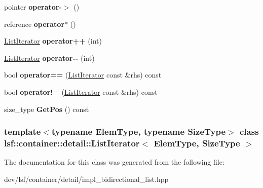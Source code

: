\begin{DoxyCompactItemize}
\item 
\hypertarget{classlsf_1_1container_1_1detail_1_1ListIterator_aae23fe9a8b582b27d49469e9b2d856a6}{
pointer {\bfseries operator-\/$>$} ()}
\label{classlsf_1_1container_1_1detail_1_1ListIterator_aae23fe9a8b582b27d49469e9b2d856a6}

\item 
\hypertarget{classlsf_1_1container_1_1detail_1_1ListIterator_a1461443a653a5e9548b0b4030ba092e7}{
reference {\bfseries operator$\ast$} ()}
\label{classlsf_1_1container_1_1detail_1_1ListIterator_a1461443a653a5e9548b0b4030ba092e7}

\item 
\hypertarget{classlsf_1_1container_1_1detail_1_1ListIterator_ad2883b3bd7d78fbac482e0cf2fb25df8}{
\hyperlink{classlsf_1_1container_1_1detail_1_1ListIterator}{ListIterator} {\bfseries operator++} (int)}
\label{classlsf_1_1container_1_1detail_1_1ListIterator_ad2883b3bd7d78fbac482e0cf2fb25df8}

\item 
\hypertarget{classlsf_1_1container_1_1detail_1_1ListIterator_aa5dd72db1d28b2d95c3da1204f3e1b46}{
\hyperlink{classlsf_1_1container_1_1detail_1_1ListIterator}{ListIterator} {\bfseries operator-\/-\/} (int)}
\label{classlsf_1_1container_1_1detail_1_1ListIterator_aa5dd72db1d28b2d95c3da1204f3e1b46}

\item 
\hypertarget{classlsf_1_1container_1_1detail_1_1ListIterator_af3b1a2bdb7a11bdcb8e29d1b548834b5}{
bool {\bfseries operator==} (\hyperlink{classlsf_1_1container_1_1detail_1_1ListIterator}{ListIterator} const \&rhs) const }
\label{classlsf_1_1container_1_1detail_1_1ListIterator_af3b1a2bdb7a11bdcb8e29d1b548834b5}

\item 
\hypertarget{classlsf_1_1container_1_1detail_1_1ListIterator_a573f8acfca6184829d4095d77d398a46}{
bool {\bfseries operator!=} (\hyperlink{classlsf_1_1container_1_1detail_1_1ListIterator}{ListIterator} const \&rhs) const }
\label{classlsf_1_1container_1_1detail_1_1ListIterator_a573f8acfca6184829d4095d77d398a46}

\item 
\hypertarget{classlsf_1_1container_1_1detail_1_1ListIterator_a495d7d4af83cd34e5830fbada7b3ac5a}{
size\_\-type {\bfseries GetPos} () const }
\label{classlsf_1_1container_1_1detail_1_1ListIterator_a495d7d4af83cd34e5830fbada7b3ac5a}

\end{DoxyCompactItemize}
\subsubsection*{template$<$typename ElemType, typename SizeType$>$ class lsf::container::detail::ListIterator$<$ ElemType, SizeType $>$}



The documentation for this class was generated from the following file:\begin{DoxyCompactItemize}
\item 
dev/lsf/container/detail/impl\_\-bidirectional\_\-list.hpp\end{DoxyCompactItemize}

